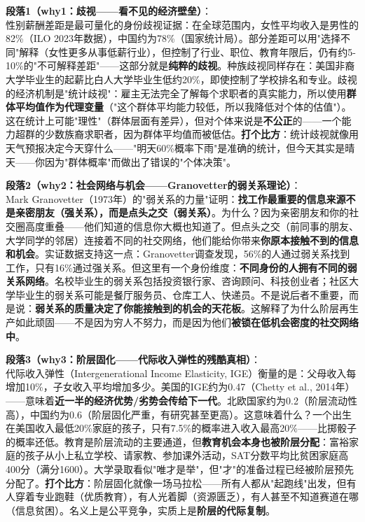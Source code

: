 \documentclass[../main.tex]{subfiles}
\begin{document}
{	\textbf{段落1（why1：歧视——看不见的经济壁垒）}：\\
	性别薪酬差距是最可量化的身份歧视证据：在全球范围内，女性平均收入是男性的82\%（ILO 2023年数据），中国约为78\%（国家统计局）。部分差距可以用"选择不同"解释（女性更多从事低薪行业），但控制了行业、职位、教育年限后，仍有约5-10\%的"不可解释差距"——这部分就是\textbf{纯粹的歧视}。种族歧视同样存在：美国非裔大学毕业生的起薪比白人大学毕业生低约20\%，即使控制了学校排名和专业。歧视的经济机制是"统计歧视"：雇主无法完全了解每个求职者的真实能力，所以使用\textbf{群体平均值作为代理变量}（"这个群体平均能力较低，所以我降低对个体的估值"）。这在统计上可能"理性"（群体层面有差异），但对个体来说是\textbf{不公正}的——一个能力超群的少数族裔求职者，因为群体平均值而被低估。\textbf{打个比方}：统计歧视就像用天气预报决定今天穿什么——"明天60\%概率下雨"是准确的统计，但今天其实是晴天——你因为"群体概率"而做出了错误的"个体决策"。

	\textbf{段落2（why2：社会网络与机会——Granovetter的弱关系理论）}：\\
	Mark Granovetter（1973年）的"弱关系的力量"证明：\textbf{找工作最重要的信息来源不是亲密朋友（强关系），而是点头之交（弱关系）}。为什么？因为亲密朋友和你的社交圈高度重叠——他们知道的信息你大概也知道了。但点头之交（前同事的朋友、大学同学的邻居）连接着不同的社交网络，他们能给你带来\textbf{你原本接触不到的信息和机会}。实证数据支持这一点：Granovetter调查发现，56\%的人通过弱关系找到工作，只有16\%通过强关系。但这里有一个身份维度：\textbf{不同身份的人拥有不同的弱关系网络}。名校毕业生的弱关系包括投资银行家、咨询顾问、科技创业者；社区大学毕业生的弱关系可能是餐厅服务员、仓库工人、快递员。不是说后者不重要，而是说：\textbf{弱关系的质量决定了你能接触到的机会的天花板}。这解释了为什么阶层再生产如此顽固——不是因为穷人不努力，而是因为他们\textbf{被锁在低机会密度的社交网络中}。

	\textbf{段落3（why3：阶层固化——代际收入弹性的残酷真相）}：\\
	代际收入弹性（Intergenerational Income Elasticity, IGE）衡量的是：父母收入每增加10\%，子女收入平均增加多少。美国的IGE约为0.47（Chetty et al., 2014年）——意味着\textbf{近一半的经济优势/劣势会传给下一代}。北欧国家约为0.2（阶层流动性高），中国约为0.6（阶层固化严重，有研究甚至更高）。这意味着什么？一个出生在美国收入最低20\%家庭的孩子，只有7.5\%的概率进入收入最高20\%——比掷骰子的概率还低。教育是阶层流动的主要通道，但\textbf{教育机会本身也被阶层分配}：富裕家庭的孩子从小上私立学校、请家教、参加课外活动，SAT分数平均比贫困家庭高400分（满分1600）。大学录取看似"唯才是举"，但"才"的准备过程已经被阶层预先分配了。\textbf{打个比方}：阶层固化就像一场马拉松——所有人都从"起跑线"出发，但有人穿着专业跑鞋（优质教育），有人光着脚（资源匮乏），有人甚至不知道赛道在哪（信息贫困）。名义上是公平竞争，实质上是\textbf{阶层的代际复制}。

}
\end{document}
